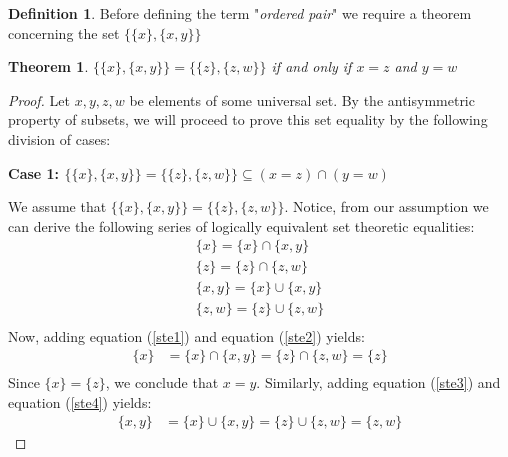 \documentclass{book}
\newtheorem{theorem}{Theorem}[section]
\theoremstyle{definition}
\newtheorem{definition}{Definition}[section]
\theoremstyle{remark}
\begin{document}
\newpage
\begin{definition}

Before defining the term "\textit{ordered pair}" we require a theorem concerning the set $\{ \{ x \}, \{ x, y \} \}$

\begin{tcolorbox}
    \begin{theorem}
        $\{ \{ x \}, \{ x, y \} \} =  \{ \{ z \}, \{ z, w \} \}$ if and only if $x=z$ and $y=w$
    \end{theorem}
\end{tcolorbox}

\begin{proof}
    Let $x, y, z, w$ be elements of some universal set. By the antisymmetric property of subsets, we will proceed to prove this set equality by the following division of cases: \\
    
    \begin{flushleft} \textbf{Case 1: $\{ \{ x \}, \{ x, y \} \} =  \{ \{ z \}, \{ z, w \} \} \subseteq (x=z) \cap (y=w)$} \end{flushleft}
    
        We assume that $\{ \{ x \}, \{ x, y \} \} =  \{ \{ z \}, \{ z, w \} \}$. Notice, from our assumption we can derive the following series of logically equivalent set theoretic equalities: 
            \begin{align}
                \{x\} = \{x\} \cap \{x,y\} \label{ste1} \\
                \{z\} = \{z\} \cap \{z,w\} \label{ste2} \\
                \{x,y\} = \{x\} \cup \{x,y\} \label{ste3} \\
                \{z,w\} =  \{z\} \cup \{z,w\} \label{ste4} \\
            \end{align}
        Now, adding equation (\ref{ste1}) and equation (\ref{ste2}) yields:
            \begin{align*}
                \{x\} & = \{x\} \cap \{x,y\} = \{z\} \cap \{z,w\} = \{z\} \\
            \end{align*}
        Since $\{x \} = \{ z \}$, we conclude that $x=y$. Similarly, adding equation (\ref{ste3}) and equation (\ref{ste4}) yields:
            \begin{align*}
                \{x,y\} & = \{x\} \cup \{x,y\} = \{z\} \cup \{z,w\} = \{z,w\}
            \end{align*}
        

\end{proof}
\end{definition}
\end{document}
